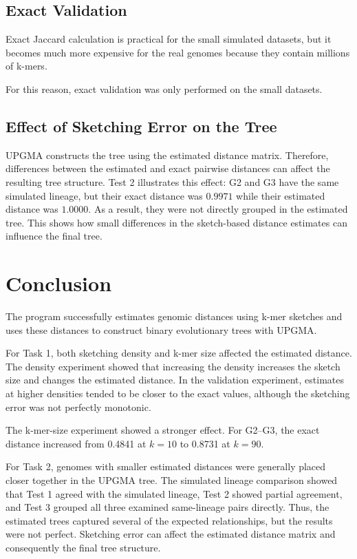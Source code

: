 \documentclass[11pt,a4paper]{article}
\begin{document}
\subsection{Exact Validation}

Exact Jaccard calculation is practical for the small simulated datasets, but
it becomes much more expensive for the real genomes because they contain
millions of k-mers.

For this reason, exact validation was only performed on the small datasets.

\subsection{Effect of Sketching Error on the Tree}

UPGMA constructs the tree using the estimated distance matrix. Therefore,
differences between the estimated and exact pairwise distances can affect
the resulting tree structure. Test 2 illustrates this effect: G2 and G3
have the same simulated lineage, but their exact distance was $0.9971$
while their estimated distance was $1.0000$. As a result, they were not
directly grouped in the estimated tree. This shows how small differences
in the sketch-based distance estimates can influence the final tree.


\section{Conclusion}

The program successfully estimates genomic distances using k-mer sketches
and uses these distances to construct binary evolutionary trees with UPGMA.

For Task 1, both sketching density and k-mer size affected the estimated
distance. The density experiment showed that increasing the density
increases the sketch size and changes the estimated distance. In the
validation experiment, estimates at higher densities tended to be closer
to the exact values, although the sketching error was not perfectly
monotonic.

The k-mer-size experiment showed a stronger effect. For G2--G3, the
exact distance increased from 0.4841 at $k=10$ to 0.8731 at $k=90$.

For Task 2, genomes with smaller estimated distances were generally
placed closer together in the UPGMA tree. The simulated lineage
comparison showed that Test 1 agreed with the simulated lineage, Test 2
showed partial agreement, and Test 3 grouped all three examined
same-lineage pairs directly. Thus, the estimated trees captured several
of the expected relationships, but the results were not perfect.
Sketching error can affect the estimated distance matrix and consequently
the final tree structure.
\end{document}

